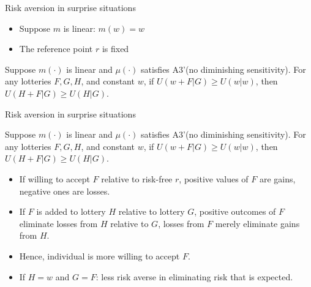 \begin{frame}{Risk aversion in surprise situations}
    \begin{itemize}
        \item Suppose $m$ is linear: $m(w)=w$\medskip
        \item The reference point $r$ is fixed\medskip
	\end{itemize}
    \begin{proposition}[1]
        Suppose $m(\cdot)$ is linear and $\mu(\cdot)$ satisfies A3'(no diminishing sensitivity).
        For any lotteries $F,G,H$, and constant $w$,        if $ U(w + F|G) \geq U(w|w)$, then $U(H+F|G) \geq U(H|G)$.\\
    \end{proposition}
\end{frame}

\begin{frame}{Risk aversion in surprise situations}
        \begin{proposition}
        Suppose $m(\cdot)$ is linear and $\mu(\cdot)$ satisfies A3'(no diminishing sensitivity).
        For any lotteries $F,G,H$, and constant $w$, if $ U(w + F|G) \geq U(w|w)$, then $U(H+F|G) \geq U(H|G)$.\\
    \end{proposition}
     \begin{itemize}
        \item If willing to accept $F$ relative to risk-free $r$, positive values of $F$ are gains, negative ones are losses.\medskip
        \item If $F$ is added to lottery $H$ relative to lottery $G$, positive outcomes of $F$ eliminate losses from $H$ relative to $G$, losses from $F$ merely eliminate gains from $H$.\medskip
        \item Hence, individual is more willing to accept $F$.\medskip
        \item If $H=w$ and $G=F$:  less risk averse in eliminating risk that is expected.\medskip
	\end{itemize}
\end{frame}


